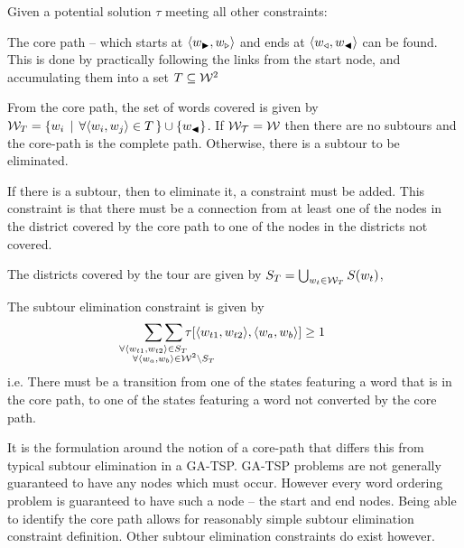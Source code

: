\documentclass[twocolumn]{article}
\begin{document}
Given a potential solution $\tau$ meeting all other constraints:

The core path -- which starts at $\langle w_{\blacktriangleright},w_{\triangleright}\rangle$
and ends at $\langle w_{\triangleleft},w_{\blacktriangleleft}\rangle$ can be found. This is done
by practically following the links from the start node, and accumulating
them into a set $T\subseteq\mathcal{W}^{2}$

From the core path, the set of words covered is given by $\mathcal{W}_{T}=\{w_{i}\,\mid\,\forall\langle w_{i},w_{j}\rangle\in T\,\}\cup\{w_{\blacktriangleleft}\}$.
If $\mathcal{W_{T}}=\mathcal{W}$ then there are no subtours and the core-path
is the complete path. Otherwise, there is a subtour to be eliminated.

If there is a subtour, then to eliminate it, a constraint must be
added. This constraint is that there must be a connection from at
least one of the nodes in the district covered by the core path to
one of the nodes in the districts not covered.

The districts covered by the tour are given by $S_{T}=\bigcup_{w_{t}\in \mathcal{W}_{T}}S(w_{t})$,

The subtour elimination constraint is given by 
\begin{equation*}
  \sum_{\mathclap{\forall\langle w_{t1},w_{t2}\rangle\in S_{T}}}
  \sum_{\mathclap{\substack{\; \\ \;\\ \forall\langle w_{a},w_{b}\rangle\in\W^{2}\backslash S_{T}}}}
  \tau[\langle w_{t1},w_{t2}\rangle,\langle w_{a},w_{b}\rangle]\ge1
\end{equation*}
i.e. There must be a transition from one of the states featuring a
word that is in the core path, to one of the states featuring a word
not converted by the core path.


It is the formulation around the notion of a core-path that differs this from typical subtour elimination in a GA-TSP. GA-TSP problems are not generally guaranteed to have any nodes which must occur. However every word ordering problem is guaranteed to have such a node -- the start and end nodes. Being able to identify the core path allows for reasonably simple subtour elimination constraint definition. Other subtour elimination constraints do exist however.
\end{document}
